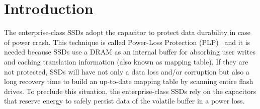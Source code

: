 \section{Introduction}


The enterprise-class SSDs adopt the capacitor to protect data durability in case of power crash. 
This technique is called Power-Loss Protection (PLP)~\cite{micron2014, intel2014, samsungplp2016} and it is needed because SSDs use a DRAM as an internal buffer for absorbing user writes and caching translation information (also known as mapping table). 
If they are not protected, SSDs will have not only a data loss and/or corruption but also a long recovery time to build an up-to-date  mapping table by scanning entire flash drives.
To preclude this situation, the enterprise-class SSDs rely on the capacitors that reserve energy to safely persist data of the volatile buffer in a power loss.


